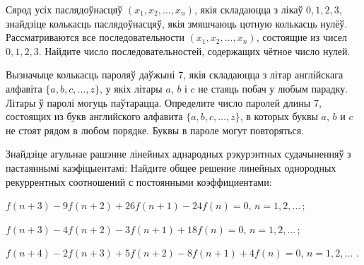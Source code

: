 \begin{problemList}
\bigskip

\problemItemSimple
{Сярод усіх паслядоўнасцяў $(x_1, x_2, \ldots, x_n)$, якія складаюцца з лікаў
$0, 1, 2, 3$, знайдзіце колькасць паслядоўнасцяў, якія змяшчаюць цотную колькасць нулёў.}
{Рассматриваются все последовательности $(x_1, x_2, \ldots, x_n)$,
состоящие из чисел $0, 1, 2, 3$. Найдите число последовательностей,
содержащих чётное число нулей.}

\bigskip

\problemItemSimple
{Вызначыце колькасць пароляў даўжыні 7, якія складаюцца з літар англійскага алфавіта
$\{a, b, c, \ldots, z\}$, у якіх літары $a$, $b$ і $c$ не стаяць побач у любым парадку.
Літары ў паролі могуць паўтарацца.}
{Определите число паролей длины 7, состоящих из букв английского
алфавита $\{a, b, c, \ldots, z\}$, в которых буквы $a$, $b$ и $c$ не
стоят рядом в любом порядке. Буквы в пароле могут повторяться.}

\bigskip

\problemItemWithCommonPart
{Знайдзіце агульнае рашэнне лінейных аднародных рэкурэнтных судачыненняў з пастаяннымі каэфіцыентамі:}
{Найдите общее решение линейных однородных рекуррентных соотношений с
постоянными коэффициентами:}
{\begin{belarusianEnumerate}
  \item $f(n + 3) - 9f(n + 2) + 26f(n + 1) - 24f(n) = 0$, $n = 1, 2, \ldots\, $;
  \item $f(n + 3) - 4f(n + 2) - 3f(n + 1) + 18f(n) = 0$, $n = 1, 2, \ldots\, $;
  \item $f(n + 4) - 2f(n + 3) + 5f(n + 2) - 8f(n + 1) + 4f(n) = 0$, $n = 1, 2, \ldots\,\, $.
\end{belarusianEnumerate}}

\end{problemList}


